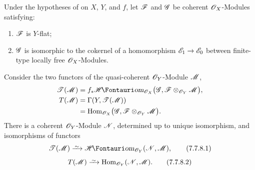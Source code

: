 \begin{corollary}[7.7.8]
\label{III.7.7.8}
Under the hypotheses of  on $X$, $Y$, and
$f$, let $\mathscr{F}$ and $\mathscr{G}$ be coherent
$\mathscr{O}_X$-Modules satisfying:
\begin{enumerate}
  \item[(i)] $\mathscr{F}$ is $Y$-flat;
  \item[(ii)] $\mathscr{G}$ is isomorphic to the cokernel of a
    homomorphism
    $\mathscr{E}_1\to\mathscr{E}_0$ between finite-type locally free
    $\mathscr{O}_X$-Modules.
\end{enumerate}
Consider the two functors of the quasi-coherent
$\mathscr{O}_Y$-Module $\mathscr{M}$,
\begin{align*}
  \sh{T}(\sh{M})
  &=
  f_*\shHom_{\sh{O}_X}
  \bigl(
    \sh{G},
    \sh{F}\otimes_{\sh{O}_Y}\sh{M}
  \bigr),\\
  T(\sh{M})
  &=
  \Gamma(Y,\sh{T}(\sh{M}))\\
  &=
  \Hom_{\sh{O}_X}
  \bigl(
    \sh{G},
    \sh{F}\otimes_{\sh{O}_Y}\sh{M}
  \bigr).
\end{align*}
There is a coherent $\mathscr{O}_Y$-Module $\mathscr{N}$, determined
up to unique isomorphism, and isomorphisms of functors
\[
  \sh{T}(\sh{M})
  \simto
  \shHom_{\sh{O}_Y}(\sh{N},\sh{M}),
  \tag{7.7.8.1}\label{III.7.7.8.1}
\]
\[
  T(\sh{M})
  \simto
  \Hom_{\sh{O}_Y}(\sh{N},\sh{M}).
  \tag{7.7.8.2}\label{III.7.7.8.2}
\]
\end{corollary}

